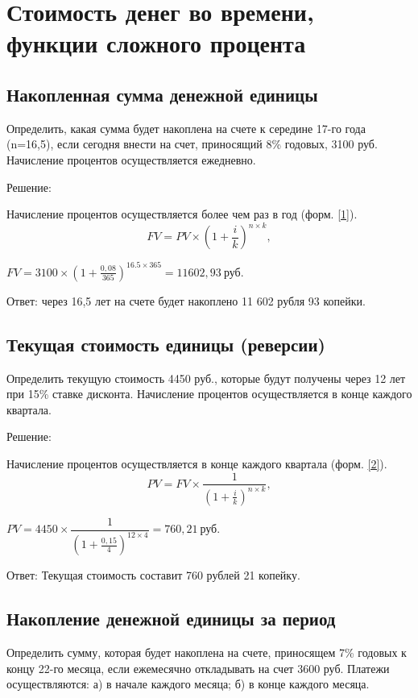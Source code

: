 \section{Стоимость денег во времени, функции сложного процента}
\subsection{Накопленная сумма денежной единицы}

Определить, какая сумма будет накоплена на счете к середине 17-го года (n=16,5), если сегодня внести на счет, приносящий 8\% годовых, 3100 руб. Начисление процентов осуществляется ежедневно.

Решение:

Начисление процентов осуществляется более чем раз в год (форм. \ref{1}).
\begin{equation}\label{1}
FV = PV \times(1+\frac{i}{k})^{n \times k},
\end{equation}

$ FV = 3100 \times (1+\frac{0,08}{365})^{16.5 \times 365} =11602,93\  \text{руб.} $

Ответ: через 16,5 лет на счете будет накоплено 11 602 рубля 93 копейки.

\subsection{Текущая стоимость единицы (реверсии)}

Определить текущую стоимость 4450 руб., которые будут получены через 12 лет при 15\% ставке дисконта. Начисление процентов осуществляется в конце каждого квартала.

Решение:

Начисление процентов осуществляется в конце каждого квартала (форм. \ref{2}).
\begin{equation}\label{2}
PV = FV \times \dfrac{1}{(1+\frac{i}{k})^{n \times k}},
\end{equation}

$ PV = 4450 \times \dfrac{1}{(1+\frac{0,15}{4})^{12 \times 4}} = 760,21\  \text{руб.}   $
	
Ответ: Текущая стоимость составит 760 рублей 21 копейку.

\subsection{Накопление денежной единицы за период}

Определить сумму, которая будет накоплена на счете, приносящем 7\% годовых к концу 22-го месяца, если ежемесячно откладывать на счет 3600 руб. Платежи осуществляются: а) в начале каждого месяца; б) в конце каждого месяца.

